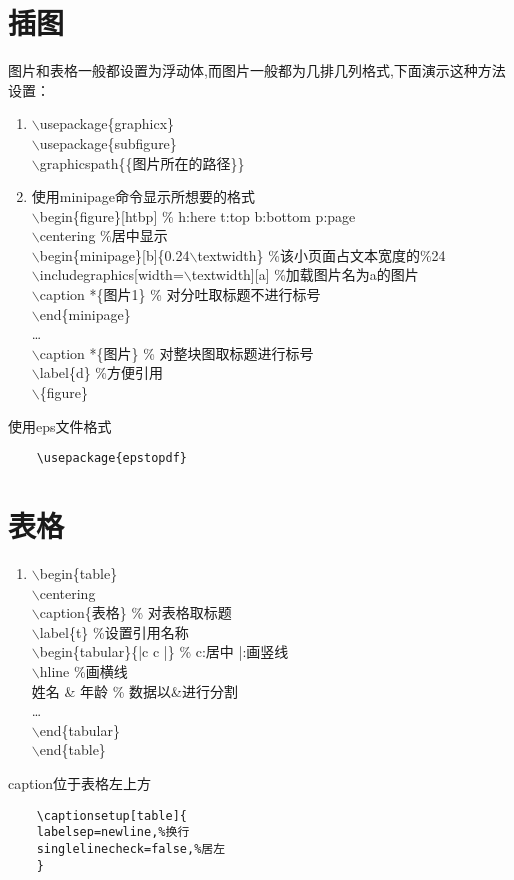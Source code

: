 \documentclass{article}
\begin{document}
\section{插图}
	图片和表格一般都设置为浮动体,而图片一般都为几排几列格式,下面演示这种方法设置：
	\begin{enumerate}[步骤1：]
		\item $\backslash$usepackage\{graphicx\}\\
				 $\backslash$usepackage\{subfigure\}\\
				  $\backslash$graphicspath\{\{图片所在的路径\}\}
		\item 使用minipage命令显示所想要的格式\\
				$\backslash$begin\{figure\}[htbp] \% h:here t:top b:bottom p:page  \\
			    $\backslash$centering \%居中显示 \\
			    $\backslash$begin\{minipage\}[b]\{0.24$\backslash$textwidth\} \%该小页面占文本宽度的\%24 \\   
			    $\backslash$includegraphics[width=$\backslash$textwidth][a]  \%加载图片名为a的图片 \\
			    $\backslash$caption *\{图片1\} \% 对分吐取标题不进行标号 \\
			    $\backslash$end\{minipage\}  \\
			    \ldots \\
			    $\backslash$caption *\{图片\} \% 对整块图取标题进行标号 \\
			   $\backslash$label\{d\}  \%方便引用 \\
			   $\backslash$\{figure\}
	\end{enumerate}
	使用eps文件格式
	\begin{lstlisting}
	\usepackage{epstopdf}
	\end{lstlisting}
\section{表格}
   \begin{enumerate}[步骤1：]
	\item	$\backslash$begin\{table\}  \\
			$\backslash$centering \\
			$\backslash$caption\{表格\}  \% 对表格取标题 \\
			$\backslash$label\{t\}   \%设置引用名称 \\
			$\backslash$begin\{tabular\}\{|c c |\}  \% c:居中 |:画竖线 \\
			$\backslash$hline \%画横线 \\
			姓名 \& 年龄  \% 数据以\&进行分割 \\
			\ldots   \\
			$\backslash$end\{tabular\} \\
			$\backslash$end\{table\}
	\end{enumerate}
	caption位于表格左上方
	\begin{lstlisting}
	\captionsetup[table]{
	labelsep=newline,%换行
	singlelinecheck=false,%居左
	}
	\end{lstlisting}
\end{document}
